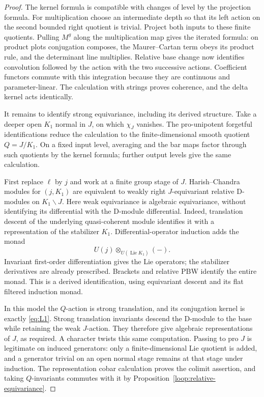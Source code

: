 \documentclass[11pt]{article}
\numberwithin{equation}{section}
\theoremstyle{definition}
\theoremstyle{remark}
\begin{document}
\begin{proof}
The kernel formula is compatible with changes of level by the
projection formula.  For multiplication choose an intermediate
depth so that its left action on the second bounded right
quotient is trivial.  Project both inputs to these finite
quotients.  Pulling $M^g$ along the multiplication map gives the
iterated formula: on product plots conjugation composes, the
Maurer--Cartan term obeys its product rule, and the determinant
line multiplies.  Relative base change now identifies convolution
followed by the action with the two successive actions.
Coefficient functors commute with this integration because they
are continuous and parameter-linear.  The calculation with
strings proves coherence, and the delta kernel acts identically.

It remains to identify strong equivariance, including its derived
structure.  Take a deeper open $K_1$ normal in $J$, on which
$\chi_J$ vanishes.  The pro-unipotent forgetful identifications
reduce the calculation to the finite-dimensional smooth quotient
$Q=J/K_1$.  On a fixed input level, averaging and the bar maps
factor through such quotients by the kernel formula; further
output levels give the same calculation.

First replace $\ell$ by $j$ and work at a finite group stage of
$J$.  Harish--Chandra modules for $(j,K_1)$ are equivalent to
weakly right $J$-equivariant relative D-modules on $K_1\backslash J$.
Here weak equivariance is algebraic equivariance, without
identifying its differential with the D-module differential.
Indeed, translation descent of the underlying quasi-coherent
module identifies it with a representation of the stabilizer
$K_1$.  Differential-operator induction adds the monad
\[
                  U(j)\otimes_{U(\operatorname{Lie}K_1)}(-).
\]
Invariant first-order differentiation gives the Lie operators;
the stabilizer derivatives are already prescribed.  Brackets
and relative PBW identify the entire monad.  This is a derived
identification, using equivariant descent and its flat filtered
induction monad.

In this model the $Q$-action is strong translation, and its
conjugation kernel is exactly \eqref{eq:L1}.  Strong translation
invariants descend the D-module to the base while retaining the
weak $J$-action.  They therefore give algebraic representations
of $J$, as required.  A character twists this same computation.
Passing to pro $J$ is legitimate on induced generators: only a
finite-dimensional Lie quotient is added, and a generator
trivial on an open normal stage remains at that stage under
induction.  The representation cobar calculation proves the
colimit assertion, and taking $Q$-invariants commutes with it
by Proposition~\ref{loop:relative-equivariance}.


\end{proof}
\end{document}
